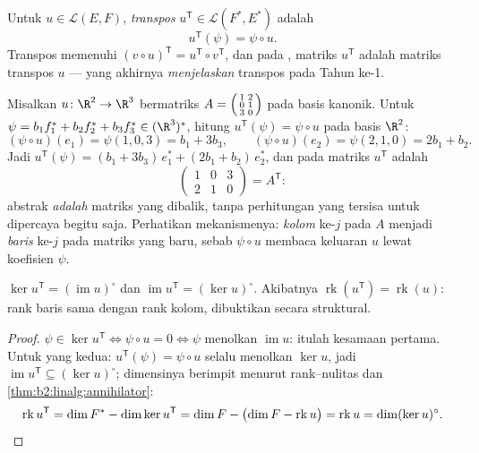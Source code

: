 \begin{definition}\label{def:b2:linalg:transpose}
Untuk $u \in \mathcal{L}(E, F)$, \emph{transpos} $u^{\mathsf T} \in \mathcal{L}(F^*, E^*)$ adalah
\[
u^{\mathsf T}(\psi) = \psi \circ u .
\]
Transpos memenuhi $(v \circ u)^{\mathsf T} = u^{\mathsf T} \circ v^{\mathsf
T}$, dan pada , matriks $u^{\mathsf T}$ adalah
matriks transpos $u$ --- yang akhirnya \emph{menjelaskan}
transpos pada Tahun ke-1.
\end{definition}

\begin{example}\label{ex:b2:linalg:transposework}
Misalkan $u \colon \R^2 \to \R^3$ bermatriks $A =
\begin{psmallmatrix} 1 & 2\\ 0 & 1\\ 3 & 0\end{psmallmatrix}$ pada
basis kanonik. Untuk $\psi = b_1f_1^* + b_2f_2^* + b_3f_3^*
\in (\R^3)^*$, hitung $u^{\mathsf T}(\psi) = \psi \circ u$ pada
basis $\R^2$:
\[
(\psi \circ u)(e_1) = \psi(1, 0, 3) = b_1 + 3b_3,
\qquad
(\psi \circ u)(e_2) = \psi(2, 1, 0) = 2b_1 + b_2 .
\]
Jadi $u^{\mathsf T}(\psi) = (b_1 + 3b_3)\,e_1^* + (2b_1 +
b_2)\,e_2^*$, dan pada  matriks $u^{\mathsf T}$
adalah
\[
\begin{pmatrix} 1 & 0 & 3\\ 2 & 1 & 0\end{pmatrix}
= A^{\mathsf T} :
\]
 abstrak \emph{adalah} matriks yang dibalik, tanpa
perhitungan yang tersisa untuk dipercaya begitu saja. Perhatikan
mekanismenya: \emph{kolom} ke-$j$ pada $A$ menjadi \emph{baris} ke-$j$
pada matriks yang baru, sebab $\psi \circ u$ membaca keluaran $u$ lewat
koefisien $\psi$.
\end{example}

\begin{proposition}\label{prop:b2:linalg:transposerank}
$\ker u^{\mathsf T} = (\operatorname{im} u)^{\circ}$ dan
$\operatorname{im} u^{\mathsf T} = (\ker u)^{\circ}$. Akibatnya
$\operatorname{rk}(u^{\mathsf T}) = \operatorname{rk}(u)$: rank baris
sama dengan rank kolom, dibuktikan secara struktural.
\end{proposition}

\begin{proof}
$\psi \in \ker u^{\mathsf T} \iff \psi \circ u = 0 \iff \psi$ menolkan
$\operatorname{im} u$: itulah kesamaan pertama. Untuk yang kedua:
$u^{\mathsf T}(\psi) = \psi \circ u$ selalu menolkan $\ker u$, jadi
$\operatorname{im} u^{\mathsf T} \subseteq (\ker u)^\circ$;
dimensinya berimpit menurut rank--nulitas dan
\cref{thm:b2:linalg:annihilator}:
\[
\operatorname{rk} u^{\mathsf T} = \dim F^* - \dim\ker u^{\mathsf T}
= \dim F - \bigl(\dim F - \operatorname{rk} u\bigr)
= \operatorname{rk} u
= \dim (\ker u)^{\circ} . \qedhere
\]
\end{proof}

